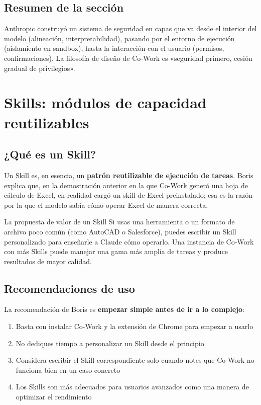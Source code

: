 \documentclass[a4paper]{article}
\begin{document}
\subsection{Resumen de la sección}

Anthropic construyó un sistema de seguridad en capas que va desde el interior del modelo (alineación, interpretabilidad), pasando por el entorno de ejecución (aislamiento en sandbox), hasta la interacción con el usuario (permisos, confirmaciones). La filosofía de diseño de Co-Work es «seguridad primero, cesión gradual de privilegios».

\section{Skills: módulos de capacidad reutilizables}

\subsection{¿Qué es un Skill?}

Un Skill es, en esencia, un \textbf{patrón reutilizable de ejecución de tareas}. Boris explica que, en la demostración anterior en la que Co-Work generó una hoja de cálculo de Excel, en realidad cargó un skill de Excel preinstalado; esa es la razón por la que el modelo sabía cómo operar Excel de manera correcta.

\begin{importantbox}{La propuesta de valor de un Skill}
Si usas una herramienta o un formato de archivo poco común (como AutoCAD o Salesforce), puedes escribir un Skill personalizado para enseñarle a Claude cómo operarlo. Una instancia de Co-Work con más Skills puede manejar una gama más amplia de tareas y produce resultados de mayor calidad.
\end{importantbox}

\subsection{Recomendaciones de uso}

La recomendación de Boris es \textbf{empezar simple antes de ir a lo complejo}:

\begin{enumerate}
    \item Basta con instalar Co-Work y la extensión de Chrome para empezar a usarlo
    \item No dediques tiempo a personalizar un Skill desde el principio
    \item Considera escribir el Skill correspondiente solo cuando notes que Co-Work no funciona bien en un caso concreto
    \item Los Skills son más adecuados para usuarios avanzados como una manera de optimizar el rendimiento
\end{enumerate}
\end{document}
